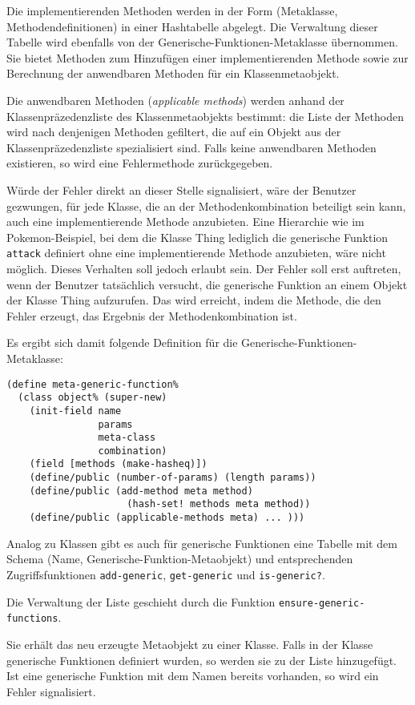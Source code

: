 Die implementierenden Methoden werden in der Form (Metaklasse, Methodendefinitionen) in einer Hashtabelle abgelegt. Die Verwaltung dieser Tabelle wird ebenfalls von der Generische-Funktionen-Metaklasse übernommen. Sie bietet Methoden zum Hinzufügen einer implementierenden Methode sowie zur Berechnung der anwendbaren Methoden für ein Klassenmetaobjekt.

Die anwendbaren Methoden (\emph{applicable methods}) werden anhand der Klassenpräzedenzliste des Klassenmetaobjekts bestimmt: die Liste der Methoden wird nach denjenigen Methoden gefiltert, die auf ein Objekt aus der Klassenpräzedenzliste spezialisiert sind. Falls keine anwendbaren Methoden existieren, so wird eine Fehlermethode zurückgegeben. 

Würde der Fehler direkt an dieser Stelle signalisiert, wäre der Benutzer gezwungen, für jede Klasse, die an der Methodenkombination beteiligt sein kann, auch eine implementierende Methode anzubieten. Eine Hierarchie wie im Pokemon-Beispiel, bei dem die Klasse Thing lediglich die generische Funktion \texttt{attack} definiert ohne eine implementierende Methode anzubieten, wäre nicht möglich. Dieses Verhalten soll jedoch erlaubt sein. Der Fehler soll erst auftreten, wenn der Benutzer tatsächlich versucht, die generische Funktion an einem Objekt der Klasse Thing aufzurufen. Das wird erreicht, indem die Methode, die den Fehler erzeugt, das Ergebnis der Methodenkombination ist.

Es ergibt sich damit folgende Definition für die Generische-Funktionen-Metaklasse:

\begin{lstlisting}
(define meta-generic-function%
  (class object% (super-new)
    (init-field name
                params
                meta-class
                combination) 
    (field [methods (make-hasheq)]) 
    (define/public (number-of-params) (length params))
    (define/public (add-method meta method) 
                     (hash-set! methods meta method))
    (define/public (applicable-methods meta) ... )))
\end{lstlisting}

Analog zu Klassen gibt es auch für generische Funktionen eine Tabelle mit dem Schema (Name, Generische-Funktion-Metaobjekt) und entsprechenden Zugriffsfunktionen \texttt{add-generic}, \texttt{get-generic} und \texttt{is-generic?}.

Die Verwaltung der Liste geschieht durch die Funktion \texttt{ensure-generic-functions}. 

Sie erhält das neu erzeugte Metaobjekt zu einer Klasse. Falls in der Klasse generische Funktionen definiert wurden, so werden sie zu der Liste hinzugefügt. Ist eine generische Funktion mit dem Namen bereits vorhanden, so wird ein Fehler signalisiert.

